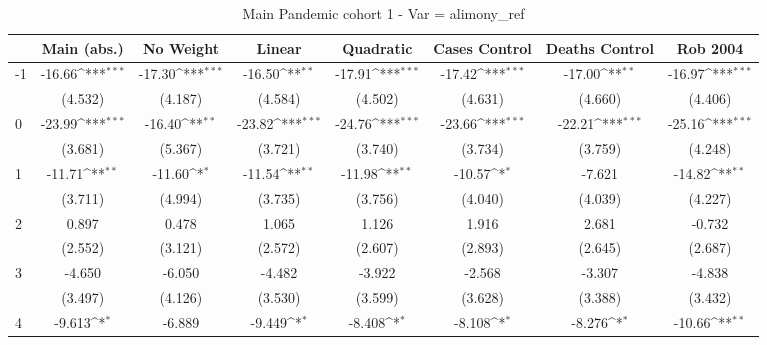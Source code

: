 \documentclass{article}
\begin{document}
{
\def\sym#1{\ifmmode^{#1}\else\(^{#1}\)\fi}
\begin{longtable}{l*{7}{c}}
\caption{Main Pandemic cohort 1 - Var = alimony\_ref}\\
\hline\hline\endfirsthead\hline\endhead\hline\endfoot\endlastfoot
                &\multicolumn{1}{c}{Main (abs.)}&\multicolumn{1}{c}{No Weight}&\multicolumn{1}{c}{Linear}&\multicolumn{1}{c}{Quadratic}&\multicolumn{1}{c}{Cases Control}&\multicolumn{1}{c}{Deaths Control}&\multicolumn{1}{c}{Rob 2004}\\
\hline
-1              &   -16.66\sym{***}&   -17.30\sym{***}&   -16.50\sym{**} &   -17.91\sym{***}&   -17.42\sym{***}&   -17.00\sym{**} &   -16.97\sym{***}\\
                &  (4.532)         &  (4.187)         &  (4.584)         &  (4.502)         &  (4.631)         &  (4.660)         &  (4.406)         \\
0               &   -23.99\sym{***}&   -16.40\sym{**} &   -23.82\sym{***}&   -24.76\sym{***}&   -23.66\sym{***}&   -22.21\sym{***}&   -25.16\sym{***}\\
                &  (3.681)         &  (5.367)         &  (3.721)         &  (3.740)         &  (3.734)         &  (3.759)         &  (4.248)         \\
1               &   -11.71\sym{**} &   -11.60\sym{*}  &   -11.54\sym{**} &   -11.98\sym{**} &   -10.57\sym{*}  &   -7.621         &   -14.82\sym{**} \\
                &  (3.711)         &  (4.994)         &  (3.735)         &  (3.756)         &  (4.040)         &  (4.039)         &  (4.227)         \\
2               &    0.897         &    0.478         &    1.065         &    1.126         &    1.916         &    2.681         &   -0.732         \\
                &  (2.552)         &  (3.121)         &  (2.572)         &  (2.607)         &  (2.893)         &  (2.645)         &  (2.687)         \\
3               &   -4.650         &   -6.050         &   -4.482         &   -3.922         &   -2.568         &   -3.307         &   -4.838         \\
                &  (3.497)         &  (4.126)         &  (3.530)         &  (3.599)         &  (3.628)         &  (3.388)         &  (3.432)         \\
4               &   -9.613\sym{*}  &   -6.889         &   -9.449\sym{*}  &   -8.408\sym{*}  &   -8.108\sym{*}  &   -8.276\sym{*}  &   -10.66\sym{**} \\

\end{longtable}}
\end{document}
